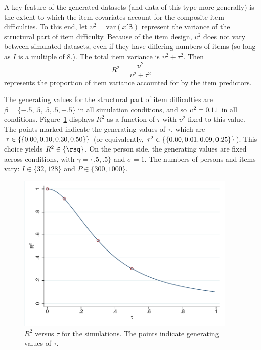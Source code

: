 \documentclass[12pt, letterpaper]{article}
\begin{document}


A key feature of the generated datasets (and data of this type more generally) is the extent to which the item covariates account for the composite item difficulties. To this end, let $\upsilon^2 = \mathrm{var}(x'\mathbf{\beta})$ represent the variance of the structural part of item difficulty. Because of the item design, $\upsilon^2$ does not vary between simulated datasets, even if they have differing numbers of items (so long as $I$ is a multiple of $8$.). The total item variance is $\upsilon^2 + \tau^2$. Then
\begin{equation}
R^2 = \frac{\upsilon^2}{\upsilon^2 + \tau^2}
\end{equation}
represents the proportion of item variance accounted for by the item predictors. 

The generating values for the structural part of item difficulties are $\beta = \{ -.5, .5, .5, .5, -.5 \}$ in all simulation conditions, and so $\upsilon^2 = 0.11$ in all conditions. Figure~\ref{fig:rsq-vs-tau} displays $R^2$ as a function of $\tau$ with $\upsilon^2$ fixed to this value. The points marked indicate the generating values of $\tau$, which are $\tau \in \{\{0.00, 0.10, 0.30, 0.50\}\}$ (or equivalently,  $\tau^2 \in \{\{0.00, 0.01, 0.09, 0.25\}\}$). This choice yields $R^2 \in \{\rsq\}$. On the person side, the generating values are fixed across conditions, with $\gamma = \{ .5, .5 \}$ and $\sigma = 1$. The numbers of persons and items vary: $I \in \{32, 128\}$ and $P \in \{300, 1000\}$.

\begin{figure}[tbp]
	\centering
	\includegraphics[height=3in, trim = 1mm 1mm 1mm 1mm, clip=true]
		{chapter_2/figs/rsq_vs_tau.pdf}
	\caption{$R^2$ versus $\tau$ for the simulations. The points indicate generating values of $\tau$.}
	\label{fig:rsq-vs-tau}
\end{figure}
\end{document}
